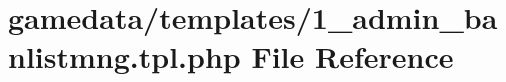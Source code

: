 \hypertarget{1__admin__banlistmng_8tpl_8php}{\section{gamedata/templates/1\+\_\+admin\+\_\+banlistmng.tpl.\+php File Reference}
\label{1__admin__banlistmng_8tpl_8php}
}
